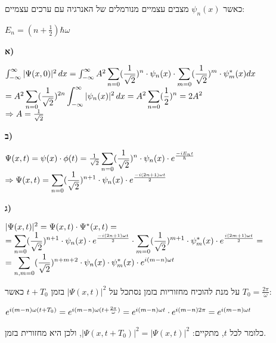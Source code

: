 \documentclass[14pt]{extarticle}
\makeatletter
\newenvironment{lefteqs}{%
    \begin{english}%
    \begin{flushleft}%
    \renewcommand{\arraystretch}{1.3}%
    $\begin{array}{@{}l@{}}%
}{%
    \end{array}$%
    \end{flushleft}%
    \end{english}%
}
\makeatother
\begin{document}
כאשר $\psi_n(x)$ מצבים עצמיים מנורמלים של האנרגיה עם ערכים עצמיים:

$E_n=(n+\frac{1}{2})\hbar \omega$

\textbf{א)}

\begin{lefteqs}
    \int_{-\infty}^{\infty} |\Psi(x,0)|^2 \, dx = \int_{-\infty}^{\infty} A^2 \displaystyle \sum_{n=0} (\frac{1}{\sqrt{2}})^n \cdot \psi_n(x) \cdot \displaystyle \sum_{m=0} (\frac{1}{\sqrt{2}})^m \cdot \psi_m^{*}(x) dx \\
    = A^2 \displaystyle \sum_{n=0} (\frac{1}{\sqrt{2}})^{2n} \int_{-\infty}^{\infty} |\psi_n(x)|^2 \, dx = A^2 \displaystyle \sum_{n=0} (\frac{1}{2})^n = 2A^2 \\
    \Rightarrow A = \frac{1}{\sqrt{2}}
\end{lefteqs}

\textbf{ב)}
\begin{lefteqs}
    \Psi(x,t) = \psi(x) \cdot \phi(t) = \frac{1}{\sqrt{2}} \displaystyle \sum_{n=0} (\frac{1}{\sqrt{2}})^n \cdot \psi_n(x) \cdot  e^{\frac{-iE_n t}{\hbar}} \\
    \Rightarrow \Psi(x,t) = \displaystyle \sum_{n=0} (\frac{1}{\sqrt{2}})^{n+1} \cdot  \psi_n(x) \cdot e^{\frac{-i(2n+1)\omega t}{2}} \\
\end{lefteqs}

\textbf{ג)}

\begin{lefteqs}
    |\Psi(x,t)|^2 = \Psi(x,t) \cdot \Psi^{*}(x,t) = \\
    = \displaystyle \sum_{n=0} (\frac{1}{\sqrt{2}})^{n+1} \cdot  \psi_n(x) \cdot e^{\frac{-i(2n+1)\omega t}{2}} \cdot \displaystyle \sum_{m=0} (\frac{1}{\sqrt{2}})^{m+1} \cdot  \psi_m^{*}(x) \cdot e^{\frac{i(2m+1)\omega t}{2}} = \\
    = \displaystyle \sum_{n,m=0} (\frac{1}{\sqrt{2}})^{n+m+2} \cdot \psi_n(x) \cdot \psi_m^{*}(x) \cdot e^{i(m-n)\omega t} \\
\end{lefteqs}

על מנת להוכיח מחזוריות בזמן נסתכל על $|\Psi(x,t)|^2$ בזמן $t+T_0$ כאשר $T_0=\frac{2\pi}{\omega}$:

\begin{lefteqs}
    e^{i(m-n)\omega(t+T_0)} = e^{i(m-n)\omega(t+\frac{2\pi}{\omega})} = e^{i(m-n)\omega t} \cdot e^{i(m-n)2\pi} = e^{i(m-n)\omega t}
\end{lefteqs}

כלומר לכל $t$, מתקיים: $|\Psi(x,t+T_0)|^2 = |\Psi(x,t)|^2$, ולכן היא מחזורית בזמן.
\end{document}
